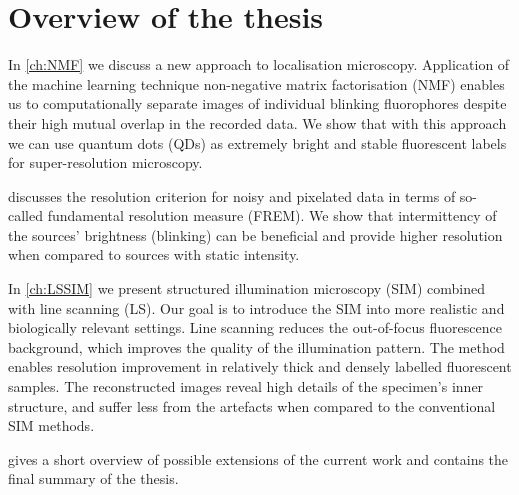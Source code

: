 \afterpage{\clearpage}
\section{Overview of the thesis}

In \autoref{ch:NMF} we discuss a new approach to localisation microscopy. Application of the machine learning technique non-negative matrix factorisation (NMF) enables us to computationally separate images of individual blinking fluorophores despite their high mutual overlap in the recorded data. We show that with this approach we can use quantum dots (QDs) as extremely bright and stable fluorescent labels for super-resolution microscopy. 

 discusses the resolution criterion for noisy and pixelated data in terms of so-called fundamental resolution measure (FREM). We show that intermittency of the sources' brightness (blinking) can be beneficial and provide higher resolution when compared to sources with static intensity. 

In \autoref{ch:LSSIM} we present structured illumination microscopy (SIM) combined with line scanning (LS). Our goal is to introduce the SIM into more realistic and biologically relevant settings. Line scanning reduces the out-of-focus fluorescence background, which improves the quality of the illumination pattern. The method enables resolution improvement in relatively thick and densely labelled fluorescent samples. The reconstructed images reveal high details of the specimen's inner structure, and suffer less from the artefacts when compared to the conventional SIM methods.  

 gives a short overview of possible extensions of the current work and contains the final summary of the thesis. 

